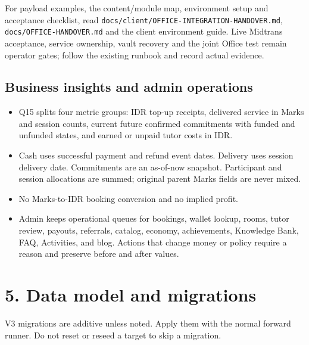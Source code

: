 \documentclass[11pt,a4paper]{article}
\newcommand{\code}[1]{\texttt{#1}}
\begin{document}
For payload examples, the content/module map, environment setup and acceptance checklist, read \code{docs/client/OFFICE-INTEGRATION-HANDOVER.md}, \code{docs/OFFICE-HANDOVER.md} and the client environment guide. Live Midtrans acceptance, service ownership, vault recovery and the joint Office test remain operator gates; follow the existing runbook and record actual evidence.

\subsection{Business insights and admin operations}

\begin{itemize}
	\item Q15 splits four metric groups: IDR top-up receipts, delivered service in Marks and session counts, current future confirmed commitments with funded and unfunded states, and earned or unpaid tutor costs in IDR.
	\item Cash uses successful payment and refund event dates. Delivery uses session delivery date. Commitments are an as-of-now snapshot. Participant and session allocations are summed; original parent Marks fields are never mixed.
	\item No Marks-to-IDR booking conversion and no implied profit.
	\item Admin keeps operational queues for bookings, wallet lookup, rooms, tutor review, payouts, referrals, catalog, economy, achievements, Knowledge Bank, FAQ, Activities, and blog. Actions that change money or policy require a reason and preserve before and after values.
\end{itemize}

\section{5. Data model and migrations}

V3 migrations are additive unless noted. Apply them with the normal forward runner. Do not reset or reseed a target to skip a migration.
\end{document}
